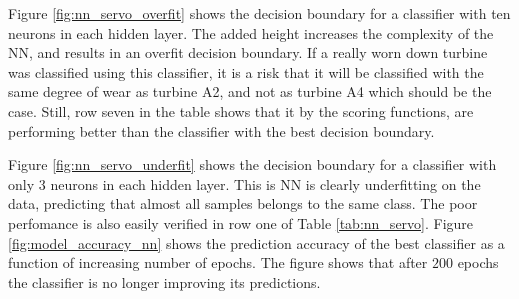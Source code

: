             Figure \ref{fig:nn_servo_overfit} shows the decision boundary for a classifier with ten neurons in each hidden layer. The added height increases the complexity of the NN, and results in an overfit decision boundary. If a really worn down turbine was classified using this classifier, it is a risk that it will be classified with the same degree of wear as turbine A2, and not as turbine A4 which should be the case. Still, row seven in the table shows that it by the scoring functions, are performing better than the classifier with the best decision boundary.  
            
            Figure \ref{fig:nn_servo_underfit} shows the decision boundary for a classifier with only 3 neurons in each hidden layer. This is NN is clearly underfitting on the data, predicting that almost all samples belongs to the same class. The poor perfomance is also easily verified in row one of Table \ref{tab:nn_servo}. Figure \ref{fig:model_accuracy_nn} shows the prediction accuracy of the best classifier as a function of increasing number of epochs. The figure shows that after $200$ epochs the classifier is no longer improving its predictions.
            
